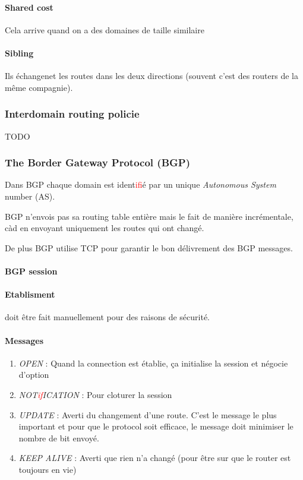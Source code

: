 \paragraph{Shared cost}
Cela arrive quand on a des domaines de taille similaire

\paragraph{Sibling}
Ils échangenet les routes dans les deux directions (souvent c'est des routers
de la même compagnie).

\subsubsection{Interdomain routing policie}
TODO

\subsubsection{The Border Gateway Protocol (BGP)}
Dans BGP chaque domain est ident\textcolor{red}{if}ié par un unique \textit{Autonomous System} number (AS).

BGP n'envois pas sa routing table entière mais le fait de manière incrémentale, càd en
envoyant uniquement les routes qui ont changé.

De plus BGP utilise TCP pour garantir le bon délivrement des BGP messages.

\paragraph{BGP session}

\paragraph{Etablisment} doit être fait manuellement pour des raisons de sécurité.

\paragraph{Messages}

\begin{enumerate}
    \item \textit{OPEN} : Quand la connection est établie, ça initialise la session et
        négocie d'option
    \item \textit{NOT\textcolor{red}{if}ICATION} : Pour cloturer la session
    \item \textit{UPDATE} : Averti du changement d'une route. C'est le message le plus important et pour que le protocol soit efficace, le message doit minimiser le nombre de bit envoyé.
    \item \textit{KEEP ALIVE} : Averti que rien n'a changé (pour être sur que le router
        est toujours en vie)
\end{enumerate}

